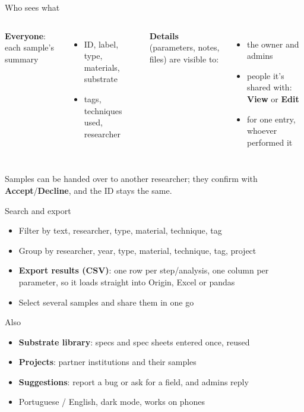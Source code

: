 \documentclass[aspectratio=169,11pt]{beamer}
\newcommand{\ui}[1]{\textsf{\textbf{#1}}}
\begin{document}
\begin{frame}{Who sees what}
  \begin{columns}[T]
    \textbf{Everyone}: each sample's summary
    \begin{itemize}\small
      \item ID, label, type, materials, substrate
      \item tags, techniques used, researcher
    \end{itemize}
    \textbf{Details} (parameters, notes, files) are visible to:
    \begin{itemize}\small
      \item the owner and admins
      \item people it's shared with: \ui{View} or \ui{Edit}
      \item for one entry, whoever performed it
    \end{itemize}
  \end{columns}

  \vspace{0.5cm}
  \small Samples can be handed over to another researcher; they confirm
  with \ui{Accept}/\ui{Decline}, and the ID stays the same.
\end{frame}

\begin{frame}{Search and export}
  \begin{itemize}
    \item Filter by text, researcher, type, material, technique, tag
    \item Group by researcher, year, type, material, technique, tag, project
    \item \ui{Export results (CSV)}: one row per step/analysis, one column
          per parameter, so it loads straight into Origin, Excel or pandas
    \item Select several samples and share them in one go
  \end{itemize}
\end{frame}

\begin{frame}{Also}
  \begin{itemize}
    \item \textbf{Substrate library}: specs and spec sheets entered once, reused
    \item \textbf{Projects}: partner institutions and their samples
    \item \textbf{Suggestions}: report a bug or ask for a field, and admins reply
    \item Portuguese / English, dark mode, works on phones
  \end{itemize}
\end{frame}
\end{document}
